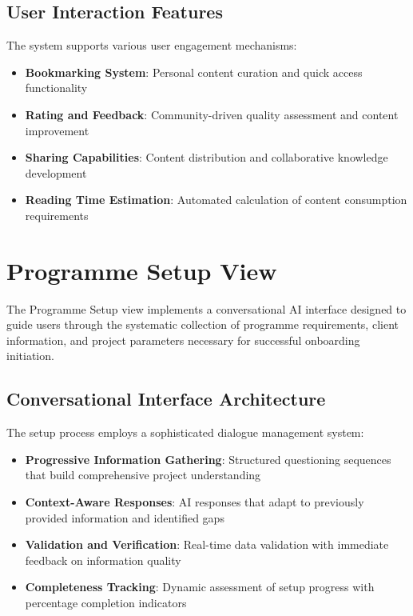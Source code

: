 \documentclass{article}
\begin{document}
\subsection{User Interaction Features}
The system supports various user engagement mechanisms:

\begin{itemize}
    \item \textbf{Bookmarking System}: Personal content curation and quick access functionality
    \item \textbf{Rating and Feedback}: Community-driven quality assessment and content improvement
    \item \textbf{Sharing Capabilities}: Content distribution and collaborative knowledge development
    \item \textbf{Reading Time Estimation}: Automated calculation of content consumption requirements
\end{itemize}

\section{Programme Setup View}
The Programme Setup view implements a conversational AI interface designed to guide users through the systematic collection of programme requirements, client information, and project parameters necessary for successful onboarding initiation.

\subsection{Conversational Interface Architecture}
The setup process employs a sophisticated dialogue management system:

\begin{itemize}
    \item \textbf{Progressive Information Gathering}: Structured questioning sequences that build comprehensive project understanding
    \item \textbf{Context-Aware Responses}: AI responses that adapt to previously provided information and identified gaps
    \item \textbf{Validation and Verification}: Real-time data validation with immediate feedback on information quality
    \item \textbf{Completeness Tracking}: Dynamic assessment of setup progress with percentage completion indicators
\end{itemize}
\end{document}
